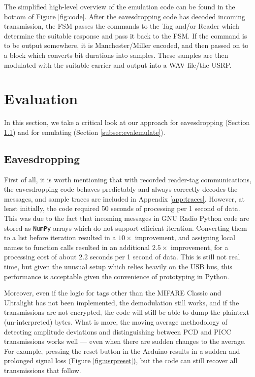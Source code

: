 \documentclass[fleqn,10pt]{SelfArx} %
\begin{document}
The simplified high-level overview of the emulation code can be found in the bottom of Figure \ref{fig:code}. After the eavesdropping code has decoded incoming transmission, the FSM passes the commands to the Tag and/or Reader which determine the suitable response and pass it back to the FSM. If the command is to be output somewhere, it is Manchester/Miller encoded, and then passed on to a block which converts bit durations into samples. These samples are then modulated with the suitable carrier and output into a WAV file/the USRP.




\section{Evaluation}
\label{sec:evaluation}

In this section, we take a critical look at our approach for eavesdropping (Section \ref{subsec:evaleavesdrop}) and for emulating (Section \ref{subsec:evalemulate}).

\subsection{Eavesdropping}
\label{subsec:evaleavesdrop}

First of all, it is worth mentioning that with recorded reader-tag communications, the eavesdropping code behaves predictably and always correctly decodes the messages, and sample traces are included in Appendix \ref{app:traces}. However, at least initially, the code required 50 seconds of processing per 1 second of data. This was due to the fact that incoming messages in GNU Radio Python code are stored as \texttt{NumPy} arrays which do not support efficient iteration. Converting them to a list before iteration resulted in a $10\times$ improvement, and assigning local names to function calls resulted in an additional $2.5\times$ improvement, for a processing cost of about 2.2 seconds per 1 second of data. This is still not real time, but given the unusual setup which relies heavily on the USB bus, this performance is acceptable given the convenience of prototyping in Python. 

Moreover, even if the logic for tags other than the MIFARE Classic and Ultralight has not been implemented, the demodulation still works, and if the transmissions are not encrypted, the code will still be able to dump the plaintext (un-interpreted) bytes. What is more, the moving average methodology of detecting amplitude deviations and distinguishing between PCD and PICC transmissions works well --- even when there are sudden changes to the average. For example, pressing the reset button in the Arduino results  in a sudden and prolonged signal loss (Figure \ref{fig:usrpreset}), but the code can still recover all transmissions that follow. 
\end{document}
